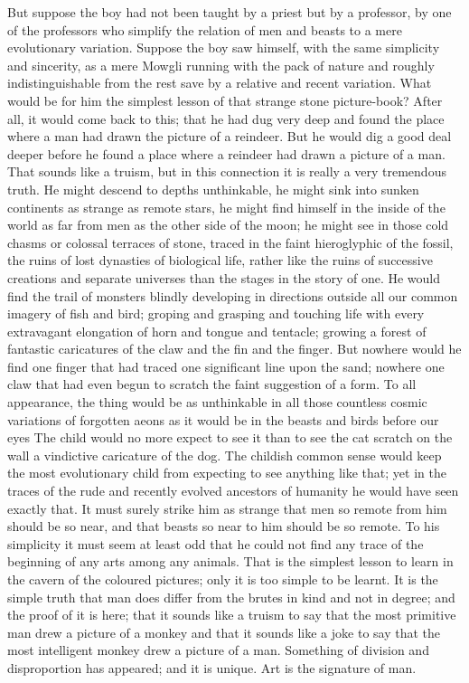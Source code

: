 But suppose the boy had not been taught by a priest but by a professor, by one of the professors who simplify the relation of men and beasts to a mere evolutionary variation. Suppose the boy saw himself, with the same simplicity and sincerity, as a mere Mowgli running with the pack of nature and roughly indistinguishable from the rest save by a relative and recent variation. What would be for him the simplest lesson of that strange stone picture-book? After all, it would come back to this; that he had dug very deep and found the place where a man had drawn the picture of a reindeer. But he would dig a good deal deeper before he found a place where a reindeer had drawn a picture of a man. That sounds like a truism, but in this connection it is really a very tremendous truth. He might descend to depths unthinkable, he might sink into sunken continents as strange as remote stars, he might find himself in the inside of the world as far from men as the other side of the moon; he might see in those cold chasms or colossal terraces of stone, traced in the faint hieroglyphic of the fossil, the ruins of lost dynasties of biological life, rather like the ruins of successive creations and separate universes than the stages in the story of one. He would find the trail of monsters blindly developing in directions outside all our common imagery of fish and bird; groping and grasping and touching life with every extravagant elongation of horn and tongue and tentacle; growing a forest of fantastic caricatures of the claw and the fin and the finger. But nowhere would he find one finger that had traced one significant line upon the sand; nowhere one claw that had even begun to scratch the faint suggestion of a form. To all appearance, the thing would be as unthinkable in all those countless cosmic variations of forgotten aeons as it would be in the beasts and birds before our eyes The child would no more expect to see it than to see the cat scratch on the wall a vindictive caricature of the dog. The childish common sense would keep the most evolutionary child from expecting to see anything like that; yet in the traces of the rude and recently evolved ancestors of humanity he would have seen exactly that. It must surely strike him as strange that men so remote from him should be so near, and that beasts so near to him should be so remote. To his simplicity it must seem at least odd that he could not find any trace of the beginning of any arts among any animals. That is the simplest lesson to learn in the cavern of the coloured pictures; only it is too simple to be learnt. It is the simple truth that man does differ from the brutes in kind and not in degree; and the proof of it is here; that it sounds like a truism to say that the most primitive man drew a picture of a monkey and that it sounds like a joke to say that the most intelligent monkey drew a picture of a man. Something of division and disproportion has appeared; and it is unique. Art is the signature of man.

